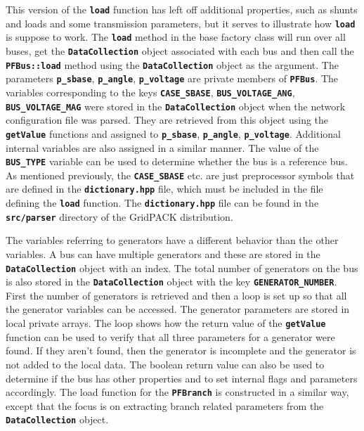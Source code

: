 This version of the \texttt{\textbf{load}} function has left off additional properties, such as shunts and loads and some transmission parameters, but it serves to illustrate how \texttt{\textbf{load}} is suppose to work. The \texttt{\textbf{load}} method in the base factory class will run over all buses, get the \texttt{\textbf{DataCollection}} object associated with each bus and then call the \texttt{\textbf{PFBus::load}} method using the \texttt{\textbf{DataCollection}} object as the argument. The parameters \texttt{\textbf{p\_sbase}}, \texttt{\textbf{p\_angle}}, \texttt{\textbf{p\_voltage}} are private members of \texttt{\textbf{PFBus}}. The variables corresponding to the keys \texttt{\textbf{CASE\_SBASE}}, \texttt{\textbf{BUS\_VOLTAGE\_ANG}}, \texttt{\textbf{BUS\_VOLTAGE\_MAG}} were stored in the \texttt{\textbf{DataCollection}} object when the network configuration file was parsed. They are retrieved from this object using the \texttt{\textbf{getValue}} functions and assigned to \texttt{\textbf{p\_sbase}}, \texttt{\textbf{p\_angle}}, \texttt{\textbf{p\_voltage}}. Additional internal variables are also assigned in a similar manner. The value of the \texttt{\textbf{BUS\_TYPE}} variable can be used to determine whether the bus is a reference bus. As mentioned previously, the \texttt{\textbf{CASE\_SBASE}} etc. are just preprocessor symbols that are defined in the \texttt{\textbf{dictionary.hpp}} file, which must be included in the file defining the \texttt{\textbf{load}} function. The \texttt{\textbf{dictionary.hpp}} file can be found in the \texttt{\textbf{src/parser}} directory of the GridPACK distribution.

The variables referring to generators have a different behavior than the other variables. A bus can have multiple generators and these are stored in the \texttt{\textbf{DataCollection}} object with an index. The total number of generators on the bus is also stored in the \texttt{\textbf{DataCollection}} object with the key \texttt{\textbf{GENERATOR\_NUMBER}}. First the number of generators is retrieved and then a loop is set up so that all the generator variables can be accessed. The generator parameters are stored in local private arrays. The loop shows how the return value of the \texttt{\textbf{getValue}} function can be used to verify that all three parameters for a generator were found. If they aren't found, then the generator is incomplete and the generator is not added to the local data. The boolean return value can also be used to determine if the bus has other properties and to set internal flags and parameters accordingly. The load function for the \texttt{\textbf{PFBranch}} is constructed in a similar way, except that the focus is on extracting branch related parameters from the \texttt{\textbf{DataCollection}} object.

